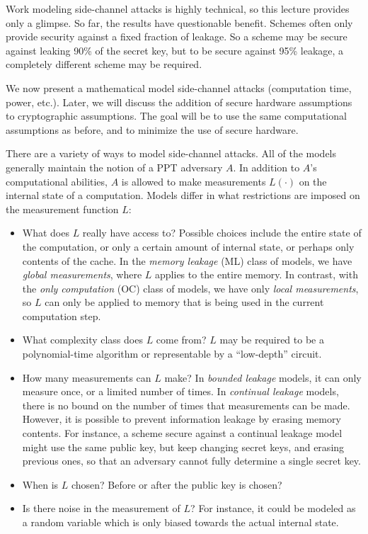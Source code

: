\documentclass[10pt]{article}
\begin{document}
Work modeling side-channel attacks is highly technical, so this lecture provides only a glimpse. So far, the results have questionable benefit. Schemes often only provide security against a fixed fraction of leakage. So a scheme may be secure against leaking 90\% of the secret key, but to be secure against 95\% leakage, a completely different scheme may be required.

We now present a mathematical model side-channel attacks (computation time, power, etc.). Later, we will discuss the addition of secure hardware assumptions to cryptographic assumptions. The goal will be to use the same computational assumptions as before, and to minimize the use of secure hardware.

There are a variety of ways to model side-channel attacks. All of the models generally maintain the notion of a PPT adversary $A$. In addition to $A$'s computational abilities, $A$ is allowed to make measurements $L(\cdot)$ on the internal state of a computation. Models differ in what restrictions are imposed on the measurement function $L$:

\begin{itemize}
\item What does $L$ really have access to? Possible choices include the entire state of the computation, or only a certain amount of internal state, or perhaps only contents of the cache. In the \emph{memory leakage} (ML) class of models, we have \emph{global measurements}, where $L$ applies to the entire memory. In contrast, with the \emph{only computation} (OC) class of models, we have only \emph{local measurements}, so $L$ can only be applied to memory that is being used in the current computation step.
\item What complexity class does $L$ come from? $L$ may be required to be a polynomial-time algorithm or representable by a ``low-depth'' circuit.
\item How many measurements can $L$ make? In \emph{bounded leakage} models, it can only measure once, or a limited number of times. In \emph{continual leakage} models, there is no bound on the number of times that measurements can be made. However, it is possible to prevent information leakage by erasing memory contents. For instance, a scheme secure against a continual leakage model might use the same public key, but keep changing secret keys, and erasing previous ones, so that an adversary cannot fully determine a single secret key.
\item When is $L$ chosen? Before or after the public key is chosen?
\item Is there noise in the measurement of $L$? For instance, it could be modeled as a random variable which is only biased towards the actual internal state.
\end{itemize}
\end{document}
